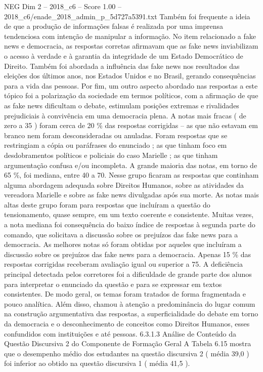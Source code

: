 \begin{textsample}{NEG Dim 2 – 2018\_c6 – Score 1.00 – 2018\_c6/enade\_2018\_admin\_p\_5d727a5391.txt}
Também foi frequente a ideia de que a produção de informações falsas é realizada por uma imprensa tendenciosa com intenção de manipular a informação.
No item relacionado a fake news e democracia, as respostas corretas afirmavam que as fake news inviabilizam o acesso à verdade e à garantia da integridade de um Estado Democrático de Direito.
Também foi abordada a influência das fake news nos resultados das eleições dos últimos anos, nos Estados Unidos e no Brasil, gerando consequências para a vida das pessoas.
Por fim, um outro aspecto abordado nas respostas a este tópico foi a polarização da sociedade em termos políticos, com a afirmação de que as fake news dificultam o debate, estimulam posições extremas e rivalidades prejudiciais à convivência em uma democracia plena.
A notas mais fracas ( de zero a 35 ) foram cerca de 20 \% das respostas corrigidas – as que não estavam em branco nem foram desconsideradas ou anuladas.
Foram respostas que se restringiam a cópia ou paráfrases do enunciado ; as que tinham foco em desdobramentos políticos e policiais do caso Marielle ; as que tinham argumentação confusa e/ou incompleta.
A grande maioria das notas, em torno de 65 \%, foi mediana, entre 40 a 70.
Nesse grupo ficaram as respostas que continham alguma abordagem adequada sobre Direitos Humanos, sobre as atividades da vereadora Marielle e sobre as fake news divulgadas após sua morte.
As notas mais altas deste grupo foram para respostas que incluíram a questão do tensionamento, quase sempre, em um texto coerente e consistente.
Muitas vezes, a nota mediana foi consequência do baixo índice de respostas à segunda parte do comando, que solicitava a discussão sobre os prejuízos das fake news para a democracia.
As melhores notas só foram obtidas por aqueles que incluíram a discussão sobre os prejuízos das fake news para a democracia.
Apenas 15 \% das respostas corrigidas receberam avaliação igual ou superior a 75.
A deficiência principal detectada pelos corretores foi a dificuldade de grande parte dos alunos para interpretar o enunciado da questão e para se expressar em textos consistentes.
De modo geral, os temas foram tratados de forma fragmentada e pouco analítica.
Além disso, chamou à atenção a predominância do lugar comum na construção argumentativa das respostas, a superficialidade do debate em torno da democracia e o desconhecimento de conceitos como Direitos Humanos, esses confundidos com instituições e até pessoas. 6.3.1.3 Análise de Conteúdo da Questão Discursiva 2 do Componente de Formação Geral A Tabela 6.15 mostra que o desempenho médio dos estudantes na questão discursiva 2 ( média 39,0 ) foi inferior ao obtido na questão discursiva 1 ( média 41,5 ).

\end{textsample}

